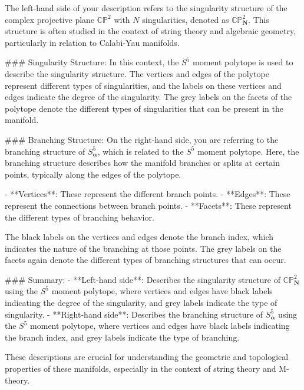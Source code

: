 The left-hand side of your description refers to the singularity structure of the complex projective plane \(\mathbb{CP}^2\) with \(N\) singularities, denoted as \(\mathbb{CP}^2_{\boldsymbol{N}}\). This structure is often studied in the context of string theory and algebraic geometry, particularly in relation to Calabi-Yau manifolds.

### Singularity Structure:
In this context, the \(S^5\) moment polytope is used to describe the singularity structure. The vertices and edges of the polytope represent different types of singularities, and the labels on these vertices and edges indicate the degree of the singularity. The grey labels on the facets of the polytope denote the different types of singularities that can be present in the manifold.

### Branching Structure:
On the right-hand side, you are referring to the branching structure of \(S^5_{\boldsymbol{\alpha}}\), which is related to the \(S^5\) moment polytope. Here, the branching structure describes how the manifold branches or splits at certain points, typically along the edges of the polytope.

- **Vertices**: These represent the different branch points.
- **Edges**: These represent the connections between branch points.
- **Facets**: These represent the different types of branching behavior.

The black labels on the vertices and edges denote the branch index, which indicates the nature of the branching at those points. The grey labels on the facets again denote the different types of branching structures that can occur.

### Summary:
- **Left-hand side**: Describes the singularity structure of \(\mathbb{CP}^2_{\boldsymbol{N}}\) using the \(S^5\) moment polytope, where vertices and edges have black labels indicating the degree of the singularity, and grey labels indicate the type of singularity.
- **Right-hand side**: Describes the branching structure of \(S^5_{\boldsymbol{\alpha}}\) using the \(S^5\) moment polytope, where vertices and edges have black labels indicating the branch index, and grey labels indicate the type of branching.

These descriptions are crucial for understanding the geometric and topological properties of these manifolds, especially in the context of string theory and M-theory.